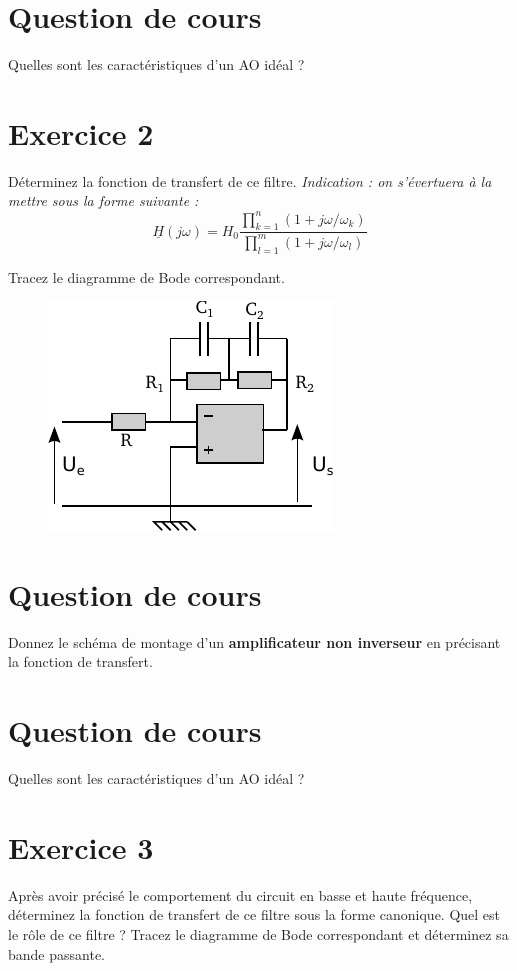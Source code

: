 \documentclass{report}
\begin{document}
\newpage

\section*{Question de cours}
Quelles sont les caractéristiques d'un AO idéal ?

\section*{Exercice 2}
Déterminez la fonction de transfert de ce filtre. \textit{Indication : on s'évertuera à la mettre sous la forme suivante :}
\begin{equation}
\underline{H}(j\omega) = H_{0}\frac{\prod_{k=1}^{n} (1+j\omega/\omega_{k})}{\prod_{l=1}^{m} (1+j\omega/\omega_{l})}
\end{equation} 

Tracez le diagramme de Bode correspondant.

\begin{figure}[!h]
\centering
\includegraphics[width=0.5\linewidth]{circuit_6.pdf}
\end{figure}

 \newpage
\section*{Question de cours}
Donnez le schéma de montage d'un \textbf{amplificateur non inverseur} en précisant la fonction de transfert.

\section*{Question de cours}

Quelles sont les caractéristiques d'un AO idéal ?

\section*{Exercice 3}
Après avoir précisé le comportement du circuit en basse et haute fréquence, déterminez la fonction de transfert de ce filtre sous la forme canonique. Quel est le rôle de ce filtre ? Tracez le diagramme de Bode correspondant et déterminez sa bande passante. 
\end{document}
